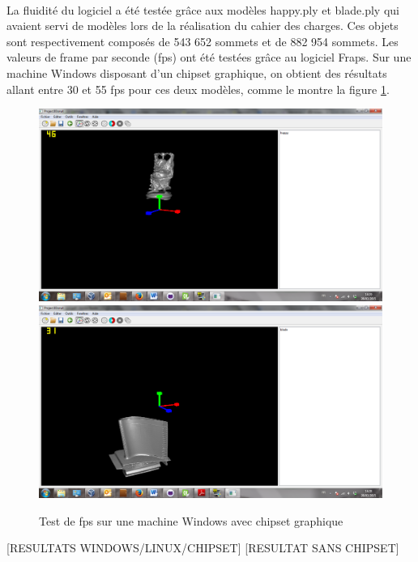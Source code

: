 \paragraph{}
La fluidité du logiciel a été testée grâce aux modèles happy.ply et blade.ply qui avaient servi de modèles lors de la réalisation du cahier des charges. Ces objets sont respectivement composés de 543 652 sommets et de 882 954 sommets. Les valeurs de frame par seconde (fps) ont été testées grâce au logiciel Fraps\footnotemark.
Sur une machine Windows disposant d'un chipset graphique, on obtient des résultats allant entre 30 et 55 fps pour ces deux modèles, comme le montre la figure \ref{fig:fps_windows_chipset}. 

\begin{figure}[h]
	\centering
	\includegraphics[scale=0.3]{happy_fps.png}
        \includegraphics[scale=0.3]{blade_fps.png}
       	\caption{\label{fig:fps_windows_chipset} Test de fps sur une machine Windows avec chipset graphique\protect}
\end{figure}
[RESULTATS WINDOWS/LINUX/CHIPSET]
[RESULTAT SANS CHIPSET]

